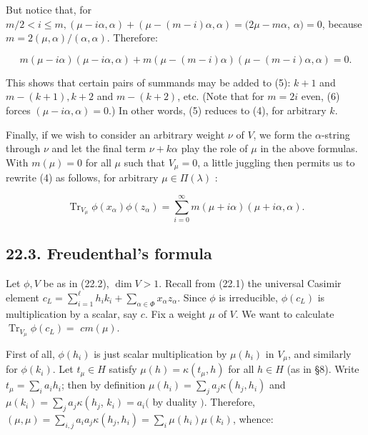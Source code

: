 \documentclass[10pt]{article}
\begin{document}
But notice that, for $m / 2<i \leq m,(\mu-i \alpha, \alpha)+(\mu-(m-i) \alpha, \alpha)=(2 \mu-m \alpha$, $\alpha)=0$, because $m=2(\mu, \alpha) /(\alpha, \alpha)$. Therefore:


\begin{equation*}
m(\mu-i \alpha)(\mu-i \alpha, \alpha)+m(\mu-(m-i) \alpha)(\mu-(m-i) \alpha, \alpha)=0 . \tag{6}
\end{equation*}


This shows that certain pairs of summands may be added to (5): $k+1$ and $m-(k+1), k+2$ and $m-(k+2)$, etc. (Note that for $m=2 i$ even, (6) forces $(\mu-i \alpha, \alpha)=0$.) In other words, (5) reduces to (4), for arbitrary $k$.

Finally, if we wish to consider an arbitrary weight $\nu$ of $V$, we form the $\alpha$-string through $\nu$ and let the final term $\nu+k \alpha$ play the role of $\mu$ in the above formulas. With $m(\mu)=0$ for all $\mu$ such that $V_{\mu}=0$, a little juggling then permits us to rewrite (4) as follows, for arbitrary $\mu \in \Pi(\lambda)$ :


\begin{equation*}
\operatorname{Tr}_{V_{\mu}} \phi\left(x_{\alpha}\right) \phi\left(z_{\alpha}\right)=\sum_{i=0}^{\infty} m(\mu+i \alpha)(\mu+i \alpha, \alpha) . \tag{7}
\end{equation*}


\subsection*{22.3. Freudenthal's formula}
Let $\phi, V$ be as in (22.2), $\operatorname{dim} V>1$. Recall from (22.1) the universal Casimir element $c_{L}=\sum_{i=1}^{\ell} h_{i} k_{i}+\sum_{\alpha \in \Phi} x_{\alpha} z_{\alpha}$. Since $\phi$ is irreducible, $\phi\left(c_{L}\right)$ is multiplication by a scalar, say $c$. Fix a weight $\mu$ of $V$. We want to calculate $\operatorname{Tr}_{V_{\mu}} \phi\left(c_{L}\right)=$ $c m(\mu)$.

First of all, $\phi\left(h_{i}\right)$ is just scalar multiplication by $\mu\left(h_{i}\right)$ in $V_{\mu}$, and similarly for $\phi\left(k_{i}\right)$. Let $t_{\mu} \in H$ satisfy $\mu(h)=\kappa\left(t_{\mu}, h\right)$ for all $h \in H$ (as in §8). Write $t_{\mu}=\sum_{i} a_{i} h_{i}$; then by definition $\mu\left(h_{i}\right)=\sum_{j} a_{j} \kappa\left(h_{j}, h_{i}\right)$ and $\mu\left(k_{i}\right)=\sum_{j} a_{j} \kappa\left(h_{j}\right.$, $\left.k_{i}\right)=a_{i}($ by duality $)$. Therefore, $(\mu, \mu)=\sum_{i, j} a_{i} a_{j} \kappa\left(h_{j}, h_{i}\right)=\sum_{i} \mu\left(h_{i}\right) \mu\left(k_{i}\right)$, whence:
\end{document}
